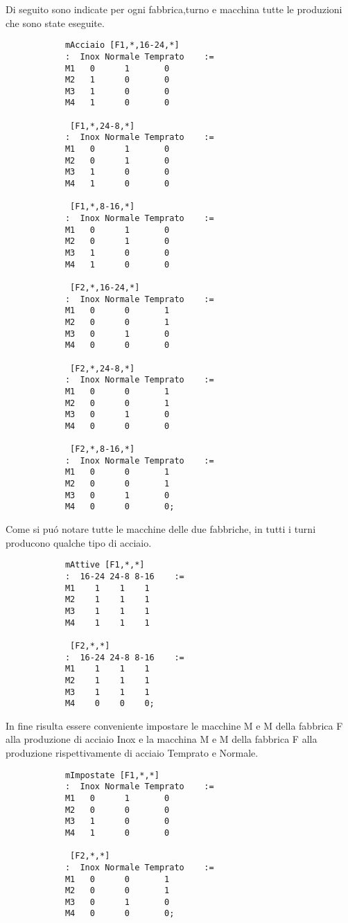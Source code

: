 \documentclass[12pt]{article} %
\begin{document}
		Di seguito sono indicate per ogni fabbrica,turno e macchina tutte le produzioni che sono state eseguite.
		\begin{lstlisting}
			mAcciaio [F1,*,16-24,*]
			:  Inox Normale Temprato    :=
			M1   0      1       0
			M2   1      0       0
			M3   1      0       0
			M4   1      0       0

			 [F1,*,24-8,*]
			:  Inox Normale Temprato    :=
			M1   0      1       0
			M2   0      1       0
			M3   1      0       0
			M4   1      0       0

			 [F1,*,8-16,*]
			:  Inox Normale Temprato    :=
			M1   0      1       0
			M2   0      1       0
			M3   1      0       0
			M4   1      0       0

			 [F2,*,16-24,*]
			:  Inox Normale Temprato    :=
			M1   0      0       1
			M2   0      0       1
			M3   0      1       0
			M4   0      0       0

			 [F2,*,24-8,*]
			:  Inox Normale Temprato    :=
			M1   0      0       1
			M2   0      0       1
			M3   0      1       0
			M4   0      0       0

			 [F2,*,8-16,*]
			:  Inox Normale Temprato    :=
			M1   0      0       1
			M2   0      0       1
			M3   0      1       0
			M4   0      0       0;
		\end{lstlisting}

		Come si pu\'o notare tutte le macchine delle due fabbriche, in tutti i turni producono qualche tipo di acciaio.
		\begin{lstlisting}
			mAttive [F1,*,*]
			:  16-24 24-8 8-16    :=
			M1    1    1    1
			M2    1    1    1
			M3    1    1    1
			M4    1    1    1

			 [F2,*,*]
			:  16-24 24-8 8-16    :=
			M1    1    1    1
			M2    1    1    1
			M3    1    1    1
			M4    0    0    0;
		\end{lstlisting}

		In fine risulta essere conveniente impostare le macchine M e M della fabbrica F alla produzione di acciaio Inox e la macchina M e M della fabbrica F alla produzione rispettivamente di acciaio Temprato e Normale.
		\begin{lstlisting}
			mImpostate [F1,*,*]
			:  Inox Normale Temprato    :=
			M1   0      1       0
			M2   0      0       0
			M3   1      0       0
			M4   1      0       0

			 [F2,*,*]
			:  Inox Normale Temprato    :=
			M1   0      0       1
			M2   0      0       1
			M3   0      1       0
			M4   0      0       0;
		\end{lstlisting}
\end{document}
